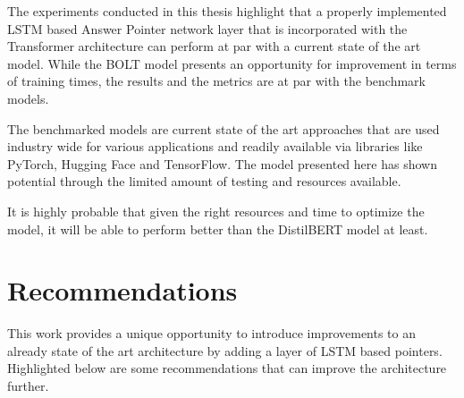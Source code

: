\documentclass[a4paper,12pt]{report}
\begin{document}
    The experiments conducted in this thesis highlight that a properly implemented LSTM based Answer Pointer network layer that is incorporated with the Transformer architecture can perform at par with a current state of the art model.
    While the BOLT model presents an opportunity for improvement in terms of training times, the results and the metrics are at par with the benchmark models.

    The benchmarked models are current state of the art approaches that are used industry wide for various applications and readily available via libraries like PyTorch, Hugging Face and TensorFlow. The model presented here has shown potential through the limited amount of testing and resources available.

    It is highly probable that given the right resources and time to optimize the model, it will be able to perform better than the DistilBERT model at least.

    \section{Recommendations}

    This work provides a unique opportunity to introduce improvements to an already state of the art architecture by adding a layer of LSTM based pointers. Highlighted below are some recommendations that can improve the architecture further.
\end{document}
